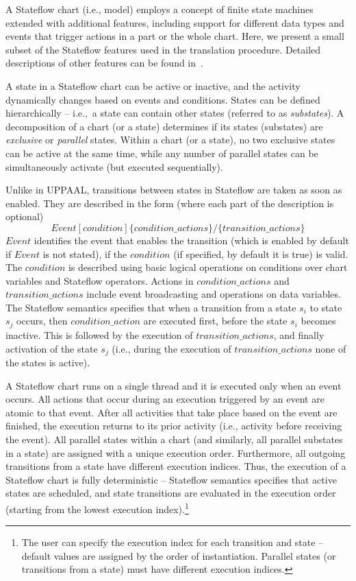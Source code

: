 A Stateflow chart (i.e., model) employs a concept of finite state machines extended with additional features, including support for different data types and events that trigger actions in a part or the whole chart. Here, we present a small subset of the Stateflow features used in the translation procedure. Detailed descriptions of other features can be found in~\cite{stateflow,SF2lustre,SFsem1,SFsem2}.

A state in a Stateflow chart can be active or inactive, and the activity dynamically changes based on events and conditions. States can be defined hierarchically -- i.e.,~a state can contain other states (referred to as \textit{substates}). 
A decomposition of a chart (or a state) determines if its states (substates) are \textit{exclusive} or \textit{parallel} states. 
Within a chart (or a state), no two exclusive states can be active at the same time, while any number of parallel states can be simultaneously activate (but executed sequentially).


Unlike in UPPAAL, transitions between states in Stateflow are taken as soon as enabled. They are described in the form (where each part of the description is optional)
\begin{equation}
\label{eqn:trans_general}
Event[condition]\{condition\_actions\}/\{transition\_actions\}
\end{equation}
$Event$ identifies the event that enables the transition (which is enabled by default if $Event$ is not stated), if the $condition$ (if specified, by default it is true) is valid. The $condition$ is described using basic logical operations on conditions over chart variables and Stateflow operators. Actions in $condition\_actions$ and $transition\_actions$ include event broadcasting and operations on data variables. The Stateflow semantics specifies that when a transition from a state $s_i$ to state $s_j$ occurs, then $condition\_action$ are executed first, before the state $s_i$ becomes inactive. This is followed by the execution of $transition\_actions$, and finally activation of the state $s_j$ (i.e., during the execution of $transition\_actions$ none of the states is active). 


A Stateflow chart runs on a single thread and it is executed only when an event occurs. All actions that occur during an execution triggered by an event are atomic to that event. After all activities that take place based on the event are finished, the execution returns to its prior activity (i.e., activity before receiving the event). 
All parallel states within a chart (and similarly, all parallel substates in a state) are assigned with a unique execution order. Furthermore, all outgoing transitions from a state have different execution indices. Thus, the execution of a Stateflow chart is fully deterministic -- Stateflow semantics specifies that active states are scheduled, and state transitions are evaluated in the execution order (starting from the lowest execution index).\footnote{The user can specify the execution index for each transition and state -- default values are assigned by the order of instantiation. Parallel states (or transitions from a state) must have different execution indices.}


